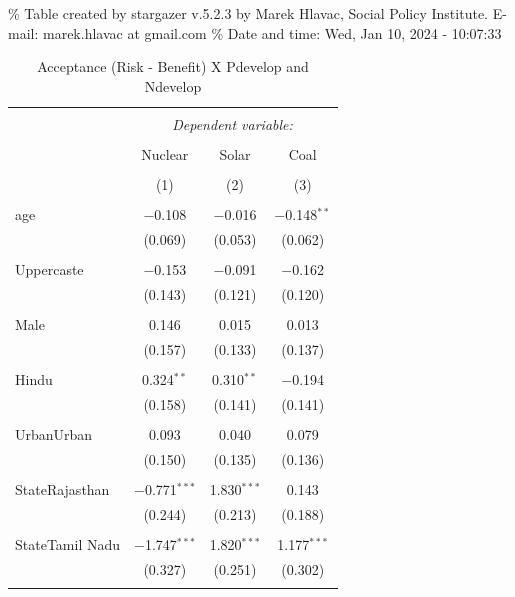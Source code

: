 \documentclass[
]{article}
\begin{document}
\begingroup\setlength{\tabcolsep}{1pt}

\renewcommand{\arraystretch}{0.7}

\% Table created by stargazer v.5.2.3 by Marek Hlavac, Social Policy
Institute. E-mail: marek.hlavac at gmail.com \% Date and time: Wed, Jan
10, 2024 - 10:07:33

\begin{table}[!htbp] \centering 
  \caption{Acceptance (Risk - Benefit) X Pdevelop and Ndevelop} 
  \label{} 
\begin{tabular}{@{\extracolsep{5pt}}lccc} 
\\[-1.8ex]\hline 
\hline \\[-1.8ex] 
 & \multicolumn{3}{c}{\textit{Dependent variable:}} \\ 
\cline{2-4} 
\\[-1.8ex] & Nuclear & Solar & Coal \\ 
\\[-1.8ex] & (1) & (2) & (3)\\ 
\hline \\[-1.8ex] 
 age & $-$0.108 & $-$0.016 & $-$0.148$^{**}$ \\ 
  & (0.069) & (0.053) & (0.062) \\ 
  & & & \\ 
 Uppercaste & $-$0.153 & $-$0.091 & $-$0.162 \\ 
  & (0.143) & (0.121) & (0.120) \\ 
  & & & \\ 
 Male & 0.146 & 0.015 & 0.013 \\ 
  & (0.157) & (0.133) & (0.137) \\ 
  & & & \\ 
 Hindu & 0.324$^{**}$ & 0.310$^{**}$ & $-$0.194 \\ 
  & (0.158) & (0.141) & (0.141) \\ 
  & & & \\ 
 UrbanUrban & 0.093 & 0.040 & 0.079 \\ 
  & (0.150) & (0.135) & (0.136) \\ 
  & & & \\ 
 StateRajasthan & $-$0.771$^{***}$ & 1.830$^{***}$ & 0.143 \\ 
  & (0.244) & (0.213) & (0.188) \\ 
  & & & \\ 
 StateTamil Nadu & $-$1.747$^{***}$ & 1.820$^{***}$ & 1.177$^{***}$ \\ 
  & (0.327) & (0.251) & (0.302) \\ 
  & & & \\ 

\end{tabular}
\end{table}
\end{document}
